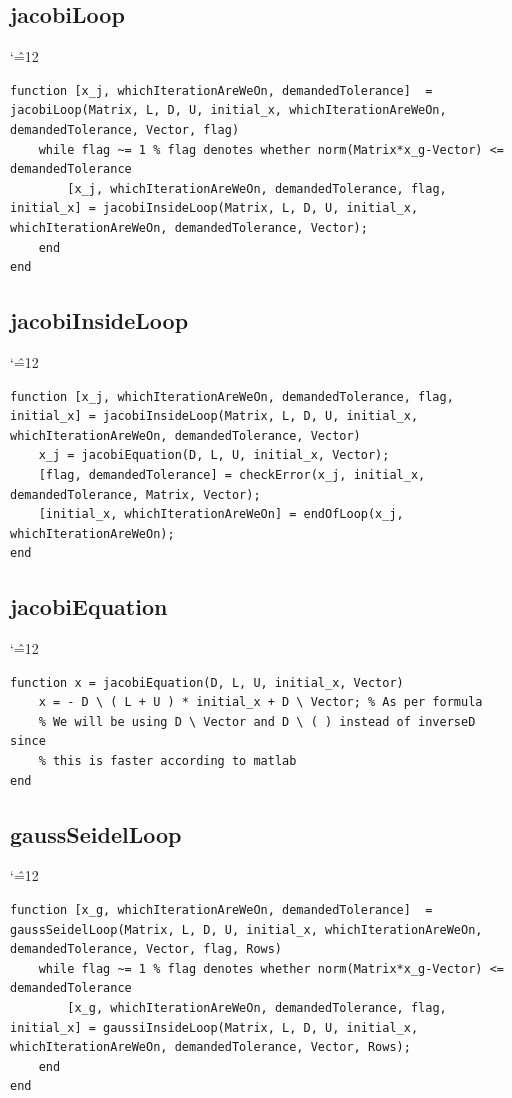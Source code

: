 \documentclass[12pt]{report}
\newenvironment{simplechar}{%
   \catcode`\^=12
}{}
\begin{document}
\newpage
\subsection{jacobiLoop}
\begin{simplechar}
\begin{lstlisting}
function [x_j, whichIterationAreWeOn, demandedTolerance]  = jacobiLoop(Matrix, L, D, U, initial_x, whichIterationAreWeOn, demandedTolerance, Vector, flag)
    while flag ~= 1 % flag denotes whether norm(Matrix*x_g-Vector) <= demandedTolerance
        [x_j, whichIterationAreWeOn, demandedTolerance, flag, initial_x] = jacobiInsideLoop(Matrix, L, D, U, initial_x, whichIterationAreWeOn, demandedTolerance, Vector);
    end
end
\end{lstlisting}
\end{simplechar}

\subsection{jacobiInsideLoop}
\begin{simplechar}
\begin{lstlisting}
function [x_j, whichIterationAreWeOn, demandedTolerance, flag, initial_x] = jacobiInsideLoop(Matrix, L, D, U, initial_x, whichIterationAreWeOn, demandedTolerance, Vector)
    x_j = jacobiEquation(D, L, U, initial_x, Vector);
    [flag, demandedTolerance] = checkError(x_j, initial_x, demandedTolerance, Matrix, Vector);
    [initial_x, whichIterationAreWeOn] = endOfLoop(x_j, whichIterationAreWeOn);
end
\end{lstlisting}
\end{simplechar}

\subsection{jacobiEquation}
\begin{simplechar}
\begin{lstlisting}
function x = jacobiEquation(D, L, U, initial_x, Vector)
    x = - D \ ( L + U ) * initial_x + D \ Vector; % As per formula
    % We will be using D \ Vector and D \ ( ) instead of inverseD since
    % this is faster according to matlab
end
\end{lstlisting}
\end{simplechar}

\subsection{gaussSeidelLoop}
\begin{simplechar}
\begin{lstlisting}
function [x_g, whichIterationAreWeOn, demandedTolerance]  = gaussSeidelLoop(Matrix, L, D, U, initial_x, whichIterationAreWeOn, demandedTolerance, Vector, flag, Rows)
    while flag ~= 1 % flag denotes whether norm(Matrix*x_g-Vector) <= demandedTolerance
        [x_g, whichIterationAreWeOn, demandedTolerance, flag, initial_x] = gaussiInsideLoop(Matrix, L, D, U, initial_x, whichIterationAreWeOn, demandedTolerance, Vector, Rows);
    end
end
\end{lstlisting}
\end{simplechar}
\end{document}
